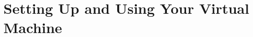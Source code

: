 \documentclass{article}
\begin{document}
\section{Setting Up and Using Your Virtual Machine}

\end{document}
